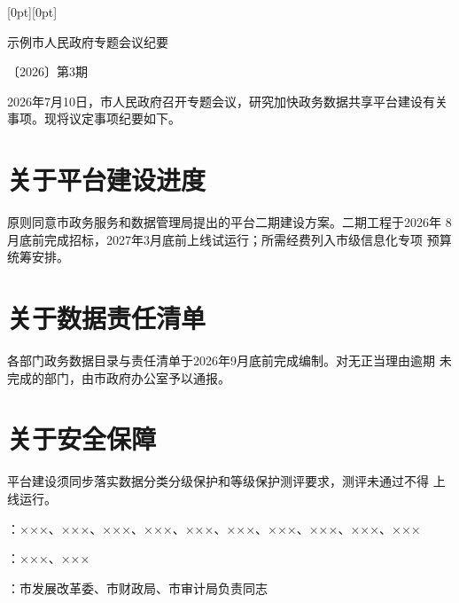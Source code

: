 \documentclass[linespread=1.81, twoside]{ctexart}
\begin{document}
\noindent\raisebox{0pt}[0pt][0pt]{\parbox[t]{\textwidth}{\mbox{}}}\par
\vspace*{\dimexpr\gwlogodrop-\topskip-\baselineskip-0.5mm\relax}
{\centering{}\xbsong\color{gwred}示例市人民政府专题会议纪要\par}
\nointerlineskip
\vspace{\dimexpr 2\baselineskip-4mm\relax}
{\centering 〔2026〕第3期\par}
\nointerlineskip
\vspace{4mm}
\noindent{\color{gwred}\rule{\textwidth}{\gwredrule}}\par
\nointerlineskip

\vspace{\dimexpr 2\baselineskip-4mm\relax}

2026年7月10日，市人民政府召开专题会议，研究加快政务数据共享平台建设有关
事项。现将议定事项纪要如下。

\section{关于平台建设进度}

原则同意市政务服务和数据管理局提出的平台二期建设方案。二期工程于2026年
8月底前完成招标，2027年3月底前上线试运行；所需经费列入市级信息化专项
预算统筹安排。

\section{关于数据责任清单}

各部门政务数据目录与责任清单于2026年9月底前完成编制。对无正当理由逾期
未完成的部门，由市政府办公室予以通报。

\section{关于安全保障}

平台建设须同步落实数据分类分级保护和等级保护测评要求，测评未通过不得
上线运行。

\par\nointerlineskip
\vspace{\baselineskip}
{\ccwd{}
\noindent\hspace{2\ccwd}{\heiti 出席}：×××、×××、×××、×××、×××、×××、×××、×××、×××、×××\par}
{\ccwd{}
\noindent\hspace{2\ccwd}{\heiti 请假}：×××、×××\par}
{\ccwd{}
\noindent\hspace{2\ccwd}{\heiti 列席}：市发展改革委、市财政局、市审计局负责同志\par}
\end{document}
